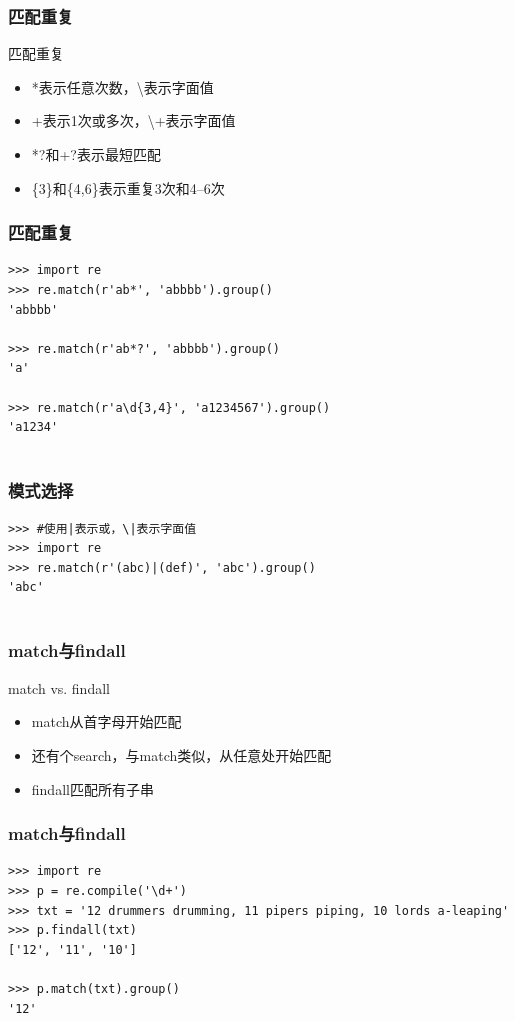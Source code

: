 \documentclass{beamer}
\begin{document}
\begin{frame}
  \frametitle{匹配重复}
	\begin{block}
		{匹配重复}
		\begin{itemize}
			\item *表示任意次数，\textbackslash *表示字面值
			\item +表示1次或多次，\textbackslash +表示字面值
			\item *?和+?表示最短匹配
			\item \{3\}和\{4,6\}表示重复3次和4--6次
		\end{itemize}
	\end{block}
\end{frame}

\begin{frame}[t,fragile]
  \frametitle{匹配重复}
\begin{verbatim}
>>> import re
>>> re.match(r'ab*', 'abbbb').group()
'abbbb'

>>> re.match(r'ab*?', 'abbbb').group()
'a'

>>> re.match(r'a\d{3,4}', 'a1234567').group()
'a1234'
		
\end{verbatim}
\end{frame}

\begin{frame}[fragile]
    \frametitle{模式选择}
\begin{verbatim}
>>> #使用|表示或，\|表示字面值
>>> import re
>>> re.match(r'(abc)|(def)', 'abc').group()
'abc'
        
\end{verbatim}

        
\end{frame}

\begin{frame}
  \frametitle{match与findall}
	\begin{block}
		{match vs. findall}
		\begin{itemize}
			\item match从首字母开始匹配
			\item 还有个search，与match类似，从任意处开始匹配
			\item findall匹配所有子串
		\end{itemize}
	\end{block}
\end{frame}

\begin{frame}[t,fragile]
  \frametitle{match与findall}
	\scriptsize
\begin{verbatim}
>>> import re
>>> p = re.compile('\d+')
>>> txt = '12 drummers drumming, 11 pipers piping, 10 lords a-leaping'
>>> p.findall(txt)
['12', '11', '10']

>>> p.match(txt).group()
'12'

\end{verbatim}
\end{frame}
\end{document}
